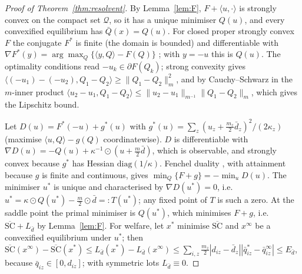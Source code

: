 \documentclass[preprint,11pt]{elsarticle}
\theoremstyle{definition}
\theoremstyle{remark}
\newcommand{\ip}[2]{\langle #1,#2\rangle}
\newcommand{\cQ}{\mathcal{Q}}
\begin{document}
\begin{proof}[Proof of Theorem~\ref{thm:resolvent}]
By Lemma~\ref{lem:F}, $F+\ip u\cdot$ is strongly convex on the compact set $\cQ$, so it has a unique minimiser $Q(u)$, and every convexified equilibrium has $\bar Q(x)=Q(u)$. For closed proper strongly convex $F$ the conjugate $F^*$ is finite (the domain is bounded) and differentiable with $\nabla F^*(y)=\arg\max_Q\{\ip yQ-F(Q)\}$ \citep[Theorem 26.3]{Rockafellar1970}; with $y=-u$ this is $Q(u)$. The optimality conditions read $-u_k\in\partial F(Q_k)$; strong convexity gives $\ip{(-u_1)-(-u_2)}{Q_1-Q_2}\ge\|Q_1-Q_2\|_m^2$, and by Cauchy--Schwarz in the $m$-inner product $\ip{u_2-u_1}{Q_1-Q_2}\le\|u_2-u_1\|_{m^{-1}}\|Q_1-Q_2\|_m$, which gives the Lipschitz bound.

Let $D(u)=F^*(-u)+g^*(u)$ with $g^*(u)=\sum_z(u_z+\tfrac{m_z}{2}\bar d_z)^2/(2\kappa_z)$ (maximise $\ip uQ-g(Q)$ coordinatewise). $D$ is differentiable with $\nabla D(u)=-Q(u)+\kappa^{-1}\odot(u+\tfrac m2\bar d)$, which is observable, and strongly convex because $g^*$ has Hessian $\mathrm{diag}(1/\kappa)$. Fenchel duality \citep[Corollary 31.2.1]{Rockafellar1970}, with attainment because $g$ is finite and continuous, gives $\min_Q\{F+g\}=-\min_uD(u)$. The minimiser $u^*$ is unique and characterised by $\nabla D(u^*)=0$, i.e.\ $u^*=\kappa\odot Q(u^*)-\tfrac m2\odot\bar d=:T(u^*)$; any fixed point of $T$ is such a zero. At the saddle point the primal minimiser is $Q(u^*)$, which minimises $F+g$, i.e.\ $\overline{\mathrm{SC}}+L_{\bar d}$ by Lemma~\ref{lem:F}. For welfare, let $x^*$ minimise $\overline{\mathrm{SC}}$ and $x^\infty$ be a convexified equilibrium under $u^*$; then $\overline{\mathrm{SC}}(x^\infty)-\overline{\mathrm{SC}}(x^*)\le L_{\bar d}(x^*)-L_{\bar d}(x^\infty)\le\sum_{i,z}\tfrac{m_z}{2}|d_{iz}-\bar d_z||\bar q^*_{iz}-\bar q^\infty_{iz}|\le E_{\bar d}$, because $\bar q_{iz}\in[0,d_{iz}]$; with symmetric lots $L_{\bar d}\equiv0$.
\end{proof}
\end{document}
